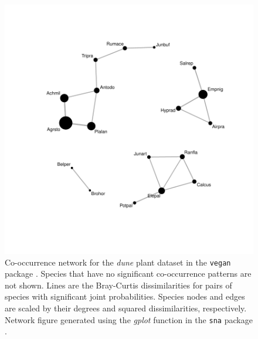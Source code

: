 \documentclass[12pt]{article}
\begin{document}
\begin{figure} 
\begin{center} 
\includegraphics{araujo_method-fig1}
\end{center} 
\caption{Co-occurrence network for the \textit{dune} plant dataset in
  the \texttt{vegan} package \cite{vegan}. Species that have no significant
  co-occurrence patterns are not shown. Lines are the Bray-Curtis
  dissimilarities for pairs of species with significant joint
  probabilities. Species nodes and edges are scaled by their degrees
  and squared dissimilarities, respectively. Network figure generated
  using the \textit{gplot} function in the \texttt{sna} package
  \cite{sna}.}
\label{fig:one}
\end{figure}


\end{document}
